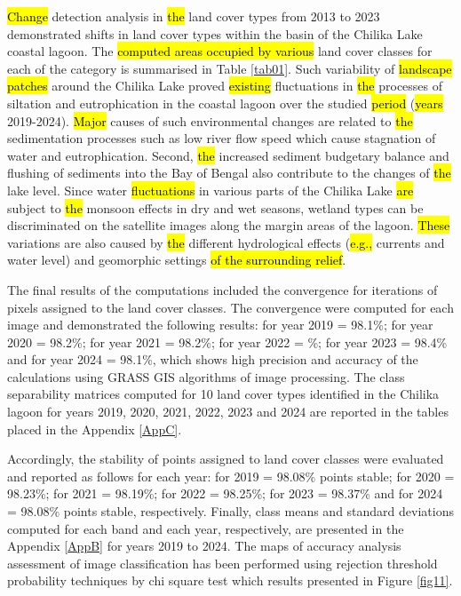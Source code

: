 \documentclass[jmse,article,submit,pdftex,moreauthors]{Definitions/mdpi}
\begin{document}
\hl{Change} detection analysis in \hl{the }land cover types from 2013 to 2023 demonstrated shifts in land cover types within the basin of the Chilika Lake coastal lagoon. The \hl{computed areas occupied by various} land cover classes for each of the category is summarised in Table \ref{tab01}. Such variability of \hl{landscape patches} around the Chilika Lake proved \hl{existing }fluctuations in \hl{the }processes of siltation and eutrophication in the coastal lagoon over the studied \hl{period} (\hl{years }2019-2024). \hl{Major} causes of such environmental changes are related to \hl{the }sedimentation processes such as low river flow speed which cause stagnation of water and eutrophication. Second, \hl{the }increased sediment budgetary balance and flushing of sediments into the Bay of Bengal also contribute to the changes of \hl{the }lake level. Since water \hl{fluctuations} in various parts of the Chilika Lake \hl{are }subject to \hl{the }monsoon effects in dry and wet seasons, wetland types can be discriminated on the satellite images along the margin areas of the lagoon. \hl{These} variations are also caused by \hl{the }different hydrological effects (\hl{e.g., }currents and water level) and geomorphic settings \hl{of the surrounding relief}. 

The final results of the computations included the convergence for iterations of pixels assigned to the land cover classes. The convergence were computed for each image and demonstrated the following results: for year 2019 = 98.1\%; for year 2020 = 98.2\%; for year 2021 = 98.2\%; for year 2022 = \%; for year 2023 = 98.4\% and for year 2024 = 98.1\%, which shows high precision and accuracy of the calculations using GRASS GIS algorithms of image processing. The class separability matrices computed for 10 land cover types identified in the Chilika lagoon for years 2019, 2020, 2021, 2022, 2023 and 2024 are reported in the tables placed in the Appendix \ref{AppC}. 

Accordingly, the stability of points assigned to land cover classes were evaluated and reported as follows for each year: for 2019 = 98.08\% points stable; for 2020 = 98.23\%; for 2021 = 98.19\%; for 2022 = 98.25\%; for 2023 = 98.37\% and for 2024 = 98.08\% points stable, respectively. Finally, class means and standard deviations computed for each band and each year, respectively, are presented in the Appendix \ref{AppB} for years 2019 to 2024. The maps of accuracy analysis assessment  of image classification has been performed using rejection threshold probability techniques by chi square test which results presented in Figure \ref{fig11}. 
\end{document}

